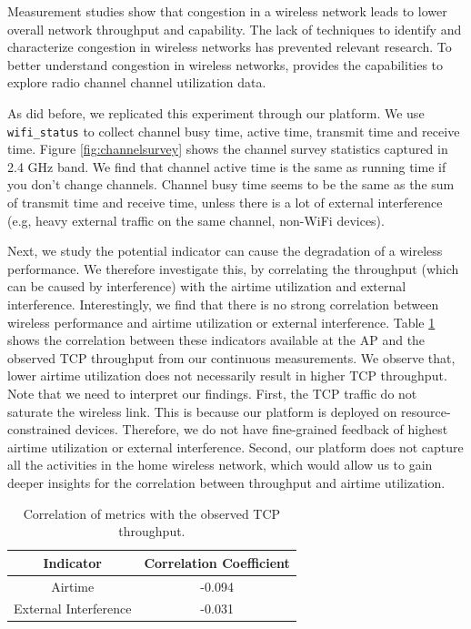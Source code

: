 Measurement studies show that congestion in a wireless network leads to lower overall network throughput and capability. The lack of techniques to identify and characterize congestion in wireless networks has prevented relevant research. To better understand congestion in wireless networks, \sysname provides the capabilities to explore radio channel channel utilization data. 

As \cite{channelsurvey} did before, we replicated this experiment through our \sysname platform. We use \texttt{wifi\_status} to collect channel busy time, active time, transmit time and receive time. Figure \ref{fig:channelsurvey} shows the channel survey statistics captured in 2.4 GHz band. We find that channel active time is the same as running time if you don't change channels. Channel busy time seems to be the same as the sum of transmit time and receive time, unless there is a lot of external interference (e.g, heavy external traffic on the same channel, non-WiFi devices).

Next, we study the potential indicator can cause the degradation of a wireless performance. We therefore investigate this, by correlating the throughput (which can be caused by interference) with the airtime utilization and external interference. Interestingly, we find that there is no strong correlation between wireless performance and airtime utilization or external interference. Table \ref{table: Correlation} shows the correlation between these indicators available at the AP and the observed TCP throughput from our continuous measurements. We observe that, lower airtime utilization does not necessarily result in higher TCP throughput. Note that we need to interpret our findings. First, the TCP traffic do not saturate the wireless link. This is because our platform is deployed on resource-constrained devices. Therefore, we do not have fine-grained feedback of highest airtime utilization or external interference. Second, our platform does not capture all the activities in the home wireless network, which would allow us to gain deeper insights for the correlation between throughput and airtime utilization. 

\begin{table}[]
\centering
\begin{tabular}{ |c|c| }
\hline
Indicator               & Correlation Coefficient  \\ 
\hline
Airtime               & -0.094  \\ 
\hline
External Interference & -0.031 \\ 
\hline
\end{tabular}
\caption{Correlation of metrics with the observed TCP throughput.}
\label{table: Correlation}
\end{table}

